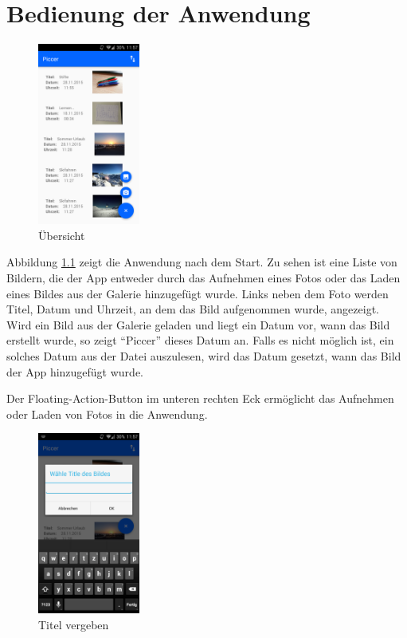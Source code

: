 
\chapter{Bedienung der Anwendung}
\begin{figure}[H]
\centering
\includegraphics[width=0.3\textwidth]{images/bild_1}
\caption{Übersicht}
\label{Bild1}
\end{figure}
Abbildung \ref{Bild1} zeigt die Anwendung nach dem Start. Zu sehen ist eine Liste von Bildern, die der App entweder durch das Aufnehmen eines Fotos oder das Laden eines Bildes
aus der Galerie hinzugefügt wurde. Links neben dem Foto werden Titel, Datum und Uhrzeit, an dem das Bild aufgenommen wurde, angezeigt. \\
Wird ein Bild aus der Galerie geladen und liegt ein Datum vor, wann das Bild erstellt wurde, so zeigt \enquote{Piccer} dieses Datum an. Falls es nicht möglich ist, ein solches
Datum aus der Datei auszulesen, wird das Datum gesetzt, wann das Bild der App hinzugefügt wurde.

Der Floating-Action-Button im unteren rechten Eck ermöglicht das Aufnehmen oder Laden von Fotos in die Anwendung.

\begin{figure}[H]
\centering
\includegraphics[width=0.3\textwidth]{images/bild_2}
\caption{Titel vergeben}
\label{Bild2}
\end{figure}

